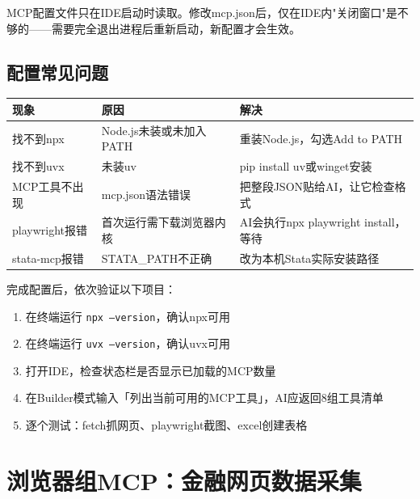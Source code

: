 \begin{notebox}[为什么要完全退出？]
MCP配置文件只在IDE启动时读取。修改mcp.json后，仅在IDE内"关闭窗口"是不够的——需要完全退出进程后重新启动，新配置才会生效。
\end{notebox}

\subsection{配置常见问题}

\begin{table}[H]
\centering
\begin{tabular}{lp{4cm}p{5cm}}
\toprule
\textbf{现象} & \textbf{原因} & \textbf{解决} \\
\midrule
找不到npx & Node.js未装或未加入PATH & 重装Node.js，勾选Add to PATH \\
找不到uvx & 未装uv & pip install uv或winget安装 \\
MCP工具不出现 & mcp.json语法错误 & 把整段JSON贴给AI，让它检查格式 \\
playwright报错 & 首次运行需下载浏览器内核 & AI会执行npx playwright install，等待 \\
stata-mcp报错 & STATA\_PATH不正确 & 改为本机Stata实际安装路径 \\
\bottomrule
\end{tabular}
\end{table}

\begin{practicebox}
完成配置后，依次验证以下项目：
\begin{enumerate}
  \item 在终端运行 \texttt{npx --version}，确认npx可用
  \item 在终端运行 \texttt{uvx --version}，确认uvx可用
  \item 打开IDE，检查状态栏是否显示已加载的MCP数量
  \item 在Builder模式输入「列出当前可用的MCP工具」，AI应返回8组工具清单
  \item 逐个测试：fetch抓网页、playwright截图、excel创建表格
\end{enumerate}
\end{practicebox}

\section{浏览器组MCP：金融网页数据采集}

